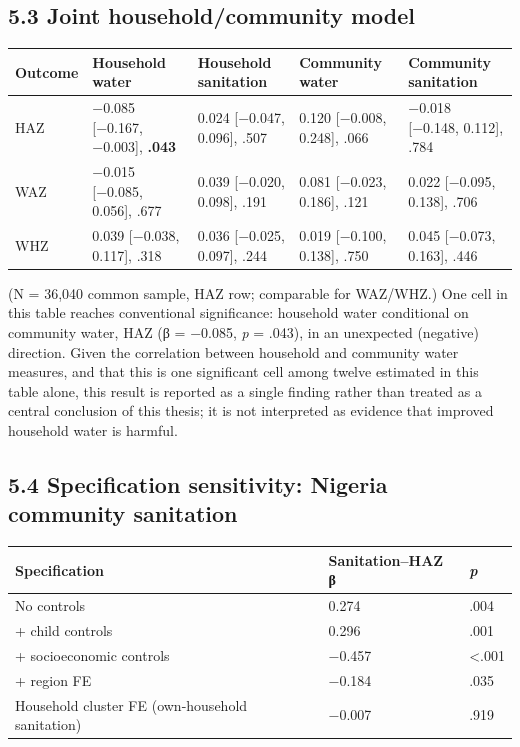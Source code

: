 \subsection*{5.3 Joint household/community model}

\begingroup\fontsize{10}{15}\selectfont
\begin{longtable}{lllll}
\toprule
Outcome & Household water & Household sanitation & Community water & Community sanitation \\
\midrule
\endhead
HAZ & −0.085 [−0.167, −0.003], \textbf{.043} & 0.024 [−0.047, 0.096], .507 & 0.120 [−0.008, 0.248], .066 & −0.018 [−0.148, 0.112], .784 \\
WAZ & −0.015 [−0.085, 0.056], .677 & 0.039 [−0.020, 0.098], .191 & 0.081 [−0.023, 0.186], .121 & 0.022 [−0.095, 0.138], .706 \\
WHZ & 0.039 [−0.038, 0.117], .318 & 0.036 [−0.025, 0.097], .244 & 0.019 [−0.100, 0.138], .750 & 0.045 [−0.073, 0.163], .446 \\
\bottomrule
\end{longtable}
\endgroup

(N = 36,040 common sample, HAZ row; comparable for WAZ/WHZ.) One cell in this table reaches conventional significance: household water conditional on community water, HAZ (β = −0.085, \textit{p} = .043), in an unexpected (negative) direction. Given the correlation between household and community water measures, and that this is one significant cell among twelve estimated in this table alone, this result is reported as a single finding rather than treated as a central conclusion of this thesis; it is not interpreted as evidence that improved household water is harmful.

\subsection*{5.4 Specification sensitivity: Nigeria community sanitation}

\begingroup\fontsize{10}{15}\selectfont
\begin{longtable}{lll}
\toprule
Specification & Sanitation--HAZ β & \textit{p} \\
\midrule
\endhead
No controls & 0.274 & .004 \\
+ child controls & 0.296 & .001 \\
+ socioeconomic controls & −0.457 & <.001 \\
+ region FE & −0.184 & .035 \\
Household cluster FE (own-household sanitation) & −0.007 & .919 \\
\bottomrule
\end{longtable}
\endgroup

